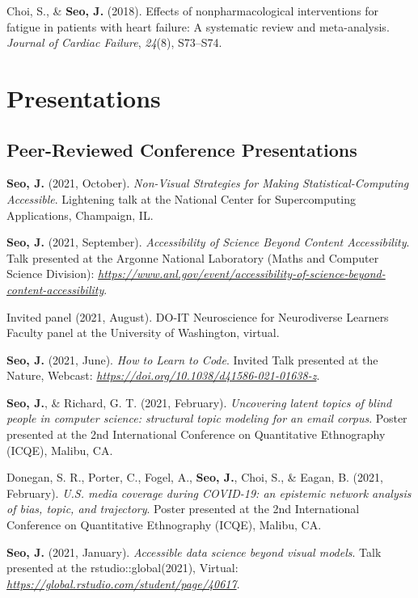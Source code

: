 \documentclass[11pt,a4paper,]{awesome-cv}
\begin{document}
\leavevmode{}%
Choi, S., \& \textbf{Seo, J.} (2018). Effects of nonpharmacological
interventions for fatigue in patients with heart failure: A systematic
review and meta-analysis. \emph{Journal of Cardiac Failure},
\emph{24}(8), S73--S74.

\hypertarget{presentations}{%
    \section{Presentations}\label{presentations}}

\hypertarget{peer-reviewed-conference-presentations}{%
    \subsection{Peer-Reviewed Conference
        Presentations}\label{peer-reviewed-conference-presentations}}

\textbf{Seo, J.} (2021, October). \emph{Non-Visual Strategies for Making
    Statistical-Computing Accessible}. Lightening talk at the National
Center for Supercomputing Applications, Champaign, IL.

\textbf{Seo, J.} (2021, September). \emph{Accessibility of Science
    Beyond Content Accessibility}. Talk presented at the Argonne National
Laboratory (Maths and Computer Science Division):
\emph{\url{https://www.anl.gov/event/accessibility-of-science-beyond-content-accessibility}}.

Invited panel (2021, August). DO-IT Neuroscience for Neurodiverse
Learners Faculty panel at the University of Washington, virtual.

\textbf{Seo, J.} (2021, June). \emph{How to Learn to Code}. Invited Talk
presented at the Nature, Webcast:
\emph{\url{https://doi.org/10.1038/d41586-021-01638-z}}.

\textbf{Seo, J.}, \& Richard, G. T. (2021, February). \emph{Uncovering
    latent topics of blind people in computer science: structural topic
    modeling for an email corpus}. Poster presented at the 2nd International
Conference on Quantitative Ethnography (ICQE), Malibu, CA.

Donegan, S. R., Porter, C., Fogel, A., \textbf{Seo, J.}, Choi, S., \&
Eagan, B. (2021, February). \emph{U.S. media coverage during COVID-19:
    an epistemic network analysis of bias, topic, and trajectory}. Poster
presented at the 2nd International Conference on Quantitative
Ethnography (ICQE), Malibu, CA.

\textbf{Seo, J.} (2021, January). \emph{Accessible data science beyond
    visual models}. Talk presented at the rstudio::global(2021), Virtual:
\emph{\url{https://global.rstudio.com/student/page/40617}}.
\end{document}
